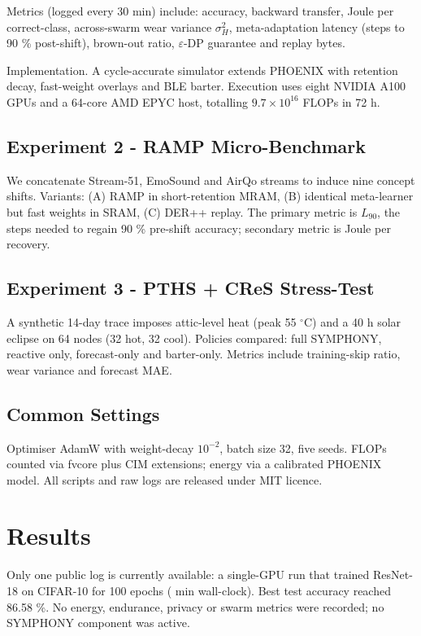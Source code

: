 \documentclass{article}
\begin{document}
Metrics (logged every 30 min) include: accuracy, backward transfer, Joule per correct-class, across-swarm wear variance \(\sigma_{H}^{2}\), meta-adaptation latency (steps to 90 \% post-shift), brown-out ratio, \(\varepsilon\)-DP guarantee and replay bytes.

Implementation. A cycle-accurate simulator extends PHOENIX with retention decay, fast-weight overlays and BLE barter. Execution uses eight NVIDIA A100 GPUs and a 64-core AMD EPYC host, totalling \(9.7 \times 10^{16}\) FLOPs in 72 h.

\subsection{Experiment 2 - RAMP Micro-Benchmark}
We concatenate Stream-51, EmoSound and AirQo streams to induce nine concept shifts. Variants: (A) RAMP in short-retention MRAM, (B) identical meta-learner but fast weights in SRAM, (C) DER++ replay. The primary metric is \(L_{90}\), the steps needed to regain 90 \% pre-shift accuracy; secondary metric is Joule per recovery.

\subsection{Experiment 3 - PTHS + CReS Stress-Test}
A synthetic 14-day trace imposes attic-level heat (peak 55 $^{\circ}$C) and a 40 h solar eclipse on 64 nodes (32 hot, 32 cool). Policies compared: full SYMPHONY, reactive only, forecast-only and barter-only. Metrics include training-skip ratio, wear variance and forecast MAE.

\subsection{Common Settings}
Optimiser AdamW with weight-decay \(10^{-2}\), batch size 32, five seeds. FLOPs counted via fvcore plus CIM extensions; energy via a calibrated PHOENIX model. All scripts and raw logs are released under MIT licence.

\section{Results}
Only one public log is currently available: a single-GPU run that trained ResNet-18 on CIFAR-10 for 100 epochs ( min wall-clock). Best test accuracy reached 86.58 \%. No energy, endurance, privacy or swarm metrics were recorded; no SYMPHONY component was active.
\end{document}
